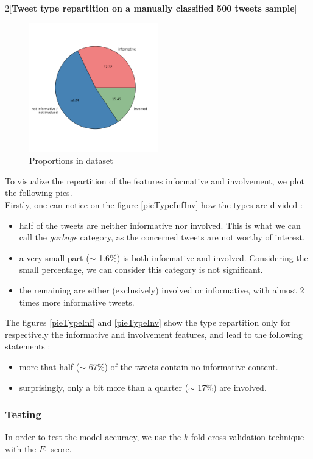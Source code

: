 \documentclass[a4paper,12pt]{report}
\begin{document}
\begin{multicols}{2}[\textbf{Tweet type repartition on a manually classified 500 tweets sample}]
\begin{figure}[H]
\centering
\includegraphics[width=0.5\textwidth]{images/plots/pies/pie_pairs3.png}
\caption{Proportions in dataset}
\end{figure}

To visualize the repartition of the features informative and involvement, we plot the following pies.\\
Firstly, one can notice on the figure \ref{pieTypeInfInv} how the types are divided : 
\begin{itemize}
\item half of the tweets are neither informative nor involved. This is what we can call the \emph{garbage} category, as the concerned tweets are not worthy of interest.
\item a very small part ($\sim$ 1.6\%) is both informative and involved. Considering the small percentage, we can consider this category is not significant.
\item the remaining are either (exclusively) involved or informative, with almost 2 times more informative tweets.
\end{itemize}

The figures \ref{pieTypeInf} and \ref{pieTypeInv} show the type repartition only for respectively the informative and involvement features, and lead to the following statements :
\begin{itemize}
\item more that half ($\sim$ 67\%) of the tweets contain no informative content.
\item surprisingly, only a bit more than a quarter ($\sim$ 17\%) are involved.
\end{itemize}


\end{multicols}

\subsubsection{Testing}
In order to test the model accuracy, we use the $k$-fold cross-validation technique with the $F_1$-score.
\end{document}

